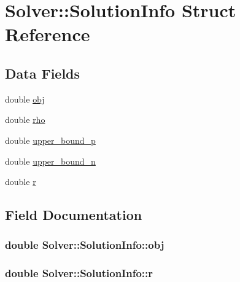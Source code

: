 \hypertarget{structSolver_1_1SolutionInfo}{}\section{Solver\+:\+:Solution\+Info Struct Reference}
\label{structSolver_1_1SolutionInfo}
\subsection*{Data Fields}
\begin{DoxyCompactItemize}
\item 
double \hyperlink{structSolver_1_1SolutionInfo_adf1d775e9152a7b1742057cd638ed2ae}{obj}
\item 
double \hyperlink{structSolver_1_1SolutionInfo_a8091f45a336af39e232f3845e25f2266}{rho}
\item 
double \hyperlink{structSolver_1_1SolutionInfo_a94c4cb7f402752326cc975ec57a8688f}{upper\+\_\+bound\+\_\+p}
\item 
double \hyperlink{structSolver_1_1SolutionInfo_a07ab9dc3265855f483922988bdaaf986}{upper\+\_\+bound\+\_\+n}
\item 
double \hyperlink{structSolver_1_1SolutionInfo_a3db948f9e914e1f9976523cfdc7c1bbe}{r}
\end{DoxyCompactItemize}


\subsection{Field Documentation}
\subsubsection[{obj}]{\setlength{\rightskip}{0pt plus 5cm}double Solver\+::\+Solution\+Info\+::obj}\hypertarget{structSolver_1_1SolutionInfo_adf1d775e9152a7b1742057cd638ed2ae}{}\label{structSolver_1_1SolutionInfo_adf1d775e9152a7b1742057cd638ed2ae}
\subsubsection[{r}]{\setlength{\rightskip}{0pt plus 5cm}double Solver\+::\+Solution\+Info\+::r}\hypertarget{structSolver_1_1SolutionInfo_a3db948f9e914e1f9976523cfdc7c1bbe}{}\label{structSolver_1_1SolutionInfo_a3db948f9e914e1f9976523cfdc7c1bbe}
